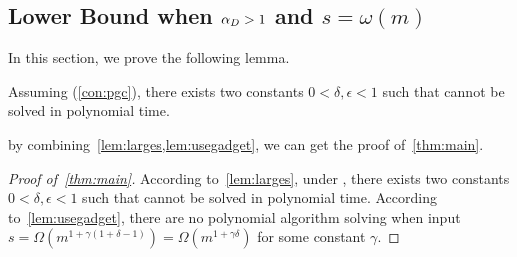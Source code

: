 \subsection{Lower Bound when \texorpdfstring{$\alpha_D>1$}{paxDge1} and \texorpdfstring{$s=\omega(m)$}{cs>1}}\label{subsec:largebicriteria}

In this section, we prove the following lemma.

\begin{lemma}\label{lem:larges}
	Assuming \conj{} (\cref{con:pgc}), there exists two constants $0<\delta,\epsilon<1$ such that  cannot be solved in polynomial time.
\end{lemma}
by combining~\cref{lem:larges,lem:usegadget}, we can get the proof of~\cref{thm:main}.
\begin{proof}[Proof of~\cref{thm:main}]
	According to~\cref{lem:larges}, under \conj{}, there exists two constants $0<\delta,\epsilon<1$ such that  cannot be solved in polynomial time. According to~\cref{lem:usegadget}, there are no polynomial algorithm solving  when input $s=\Omega(m^{1+\gamma(1+\delta-1)})=\Omega(m^{1+\gamma\delta})$ for some constant $\gamma$. 
\end{proof}

